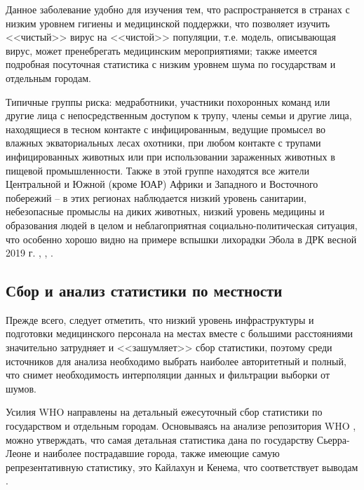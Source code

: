 Данное заболевание удобно для изучения тем, что распространяется в странах с низким уровнем гигиены и медицинской поддержки, что позволяет изучить <<чистый>> вирус на <<чистой>> популяции,  т.е. модель, описывающая вирус, может пренебрегать медицинским мероприятиями; также имеется подробная посуточная статистика с низким уровнем шума по государствам и отдельным городам.


Типичные группы риска: медработники, участники похоронных команд или другие лица с непосредственным доступом к трупу, члены семьи и другие лица, находящиеся в тесном контакте с инфицированным, ведущие промысел во влажных экваториальных лесах охотники, при любом контакте с трупами инфицированных животных или при использовании зараженных животных в пищевой промышленности. Также в этой группе находятся все жители Центральной и  Южной (кроме ЮАР) Африки  и Западного и Восточного  побережий -- в этих регионах наблюдается низкий уровень санитарии, небезопасные промыслы на диких животных, низкий уровень медицины и образования людей в целом и неблагоприятная социально-политическая ситуация, что особенно хорошо видно на примере вспышки лихорадки Эбола в ДРК весной 2019 г. \cite{WHOReport:25apr2019}, \cite{WHOReport:02may2019}, \cite{WHOReport:09may2019}.


\subsection{Сбор  и анализ статистики по местности}

Прежде всего, следует отметить, что низкий уровень инфраструктуры и подготовки медицинского персонала на местах вместе с большими расстояниями значительно затрудняет и <<зашумляет>> сбор статистики, поэтому среди источников для анализа необходимо выбрать наиболее авторитетный и полный, что снимет необходимость интерполяции данных и фильтрации выборки от шумов.


Усилия WHO направлены на детальный ежесуточный сбор статистики по государством и отдельным городам. Основываясь на анализе репозитория WHO \cite{github_ebola_data:2014} %
, можно утверждать, что самая детальная статистика дана по государству Сьерра-Леоне и наиболее пострадавшие города, также имеющие самую репрезентативную статистику, это Кайлахун и Кенема, что соответствует выводам \cite{Bykova:2015}%
.

